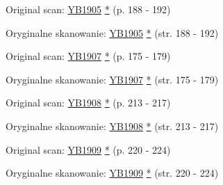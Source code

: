 Original scan: \href{https://documents.adventistarchives.org/Yearbooks/YB1905.pdf#search=Yearbook%201905}{YB1905} \href{https://forgotten-pillar.s3.us-east-2.amazonaws.com/YB1905.pdf}{*} (p. 188 - 192)


Oryginalne skanowanie: \href{https://documents.adventistarchives.org/Yearbooks/YB1905.pdf#search=Yearbook%201905}{YB1905} \href{https://forgotten-pillar.s3.us-east-2.amazonaws.com/YB1905.pdf}{*} (str. 188 - 192)






Original scan: \href{https://documents.adventistarchives.org/Yearbooks/YB1907.pdf#search=Yearbook%201906}{YB1907} \href{https://forgotten-pillar.s3.us-east-2.amazonaws.com/YB1907.pdf}{*} (p. 175 - 179)


Oryginalne skanowanie: \href{https://documents.adventistarchives.org/Yearbooks/YB1907.pdf#search=Yearbook%201906}{YB1907} \href{https://forgotten-pillar.s3.us-east-2.amazonaws.com/YB1907.pdf}{*} (str. 175 - 179)






Original scan: \href{https://documents.adventistarchives.org/Yearbooks/YB1908.pdf#search=Yearbook%201906}{YB1908} \href{https://forgotten-pillar.s3.us-east-2.amazonaws.com/YB1908.pdf}{*} (p. 213 - 217)


Oryginalne skanowanie: \href{https://documents.adventistarchives.org/Yearbooks/YB1908.pdf#search=Yearbook%201906}{YB1908} \href{https://forgotten-pillar.s3.us-east-2.amazonaws.com/YB1908.pdf}{*} (str. 213 - 217)






Original scan: \href{https://documents.adventistarchives.org/Yearbooks/YB1909.pdf#search=Yearbook%201909}{YB1909} \href{https://forgotten-pillar.s3.us-east-2.amazonaws.com/YB1909.pdf}{*} (p. 220 - 224)


Oryginalne skanowanie: \href{https://documents.adventistarchives.org/Yearbooks/YB1909.pdf#search=Yearbook%201909}{YB1909} \href{https://forgotten-pillar.s3.us-east-2.amazonaws.com/YB1909.pdf}{*} (str. 220 - 224)




